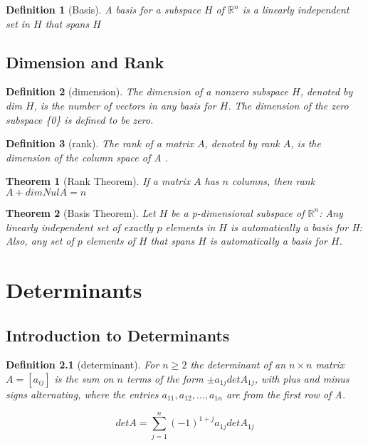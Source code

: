 \documentclass[oneside]{report}
\newtheorem{theorem}{Theorem}[section]
\newtheorem{definition}{Definition}[section]
\begin{document}
\begin{definition} [Basis]
  A basis for a subspace $H$ of $\mathbb{R}^n$ is a linearly independent set in $H$ that spans $H$
\end{definition}

\section{Dimension and Rank}

\begin{definition}[dimension]
  The dimension of a nonzero subspace $H$, denoted by dim $H$, is the number of
vectors in any basis for $H$. The dimension of the zero subspace \{0\} is defined to
be zero.
\end{definition}

\begin{definition}[rank]
  The rank of a matrix $A$, denoted by rank $A$, is the dimension of the column space
of A .
\end{definition}

\begin{theorem}[Rank Theorem]
  If a matrix $A$ has $n$ columns, then rank $A + dim Nul A = n$
\end{theorem}

\begin{theorem}[Basis Theorem]
  Let $H$ be a p-dimensional subspace of $\mathbb{R}^n$: Any linearly independent set of exactly
$p$ elements in $H$ is automatically a basis for H: Also, any set of $p$ elements of $H$
that spans $H$ is automatically a basis for $H$.
\end{theorem}

\chapter{Determinants}

\section{Introduction to Determinants}

\begin{definition}[determinant]
  For $n \geq 2$ the determinant of an $n \times n$ matrix $A = [a_{ij}]$ is the sum on $n$ terms of the form $\pm a_{1j} det A_{1j}$, with plus and minus signs alternating, where the entries $a_{11}, a_{12}, \dots , a_{1n}$ are from the first row of A.
  \begin{center}
    $$det A = \sum_{j=1}^{n} (-1)^{1+j} a_{1j}detA_{1j}$$
  \end{center}
\end{definition}
\end{document}
